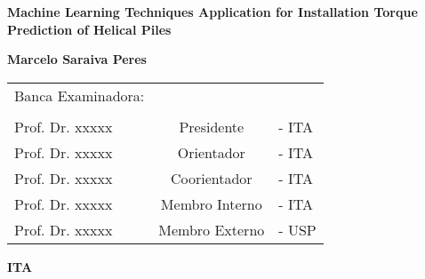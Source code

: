 
\begin{titlepage}
\begin{onehalfspace}
\begin{center}

\textbf{\large{} Machine Learning Techniques Application for Installation Torque Prediction of Helical Piles\\}{\large}

\vspace*{4cm}

\textbf{\large{}Marcelo Saraiva Peres\\}{\large}

\end{center}
\vspace*{10cm}

\noindent %
\begin{tabular}{lcl}
Banca Examinadora: &  & \tabularnewline
 &  & \tabularnewline
Prof. Dr. xxxxx         & Presidente   & - ITA \tabularnewline
Prof. Dr. xxxxx       & Orientador   & - ITA \tabularnewline
Prof. Dr. xxxxx      & Coorientador & - ITA \tabularnewline
Prof. Dr. xxxxx                 & Membro Interno              & - ITA\tabularnewline
Prof. Dr. xxxxx                  &   Membro Externo           & - USP\tabularnewline
\end{tabular}


\vfill
\begin{center}
\textbf{\large{}ITA}
\end{center}

\end{onehalfspace}
\end{titlepage}






